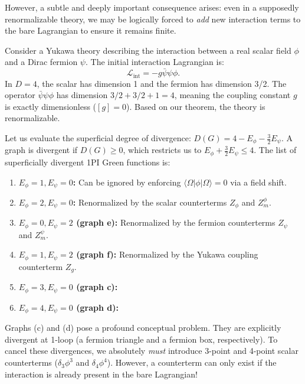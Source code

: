 However, a subtle and deeply important consequence arises: even in a supposedly renormalizable theory, we may be logically forced to \textit{add} new interaction terms to the bare Lagrangian to ensure it remains finite.

\begin{example}
    Consider a Yukawa theory describing the interaction between a real scalar field $\phi$ and a Dirac fermion $\psi$. The initial interaction Lagrangian is:
    \[
        \mathcal{L}_{\text{int}} = -g \bar{\psi} \psi \phi.
    \]
    In $D=4$, the scalar has dimension 1 and the fermion has dimension 3/2. The operator $\bar{\psi}\psi\phi$ has dimension $3/2 + 3/2 + 1 = 4$, meaning the coupling constant $g$ is exactly dimensionless ($[g]=0$). Based on our theorem, the theory is renormalizable.

    Let us evaluate the superficial degree of divergence: $D(G) = 4 - E_\phi - \frac{3}{2}E_\psi$. A graph is divergent if $D(G) \geq 0$, which restricts us to $E_\phi + \frac{3}{2}E_\psi \leq 4$. The list of superficially divergent 1PI Green functions is:


    \begin{enumerate}[label=(\alph*)]
        \item \textbf{$E_\phi=1, E_\psi=0$:} Can be ignored by enforcing $\langle \Omega | \phi | \Omega \rangle = 0$ via a field shift.
        \item \textbf{$E_\phi=2, E_\psi=0$:} Renormalized by the scalar counterterms $Z_\phi$ and $Z_m^\phi$.
        \item \textbf{$E_\phi=0, E_\psi=2$ (graph e):} Renormalized by the fermion counterterms $Z_\psi$ and $Z_m^\psi$.
        \item \textbf{$E_\phi=1, E_\psi=2$ (graph f):} Renormalized by the Yukawa coupling counterterm $Z_g$.
        \item \textbf{$E_\phi=3, E_\psi=0$ (graph c):} 
        \item \textbf{$E_\phi=4, E_\psi=0$ (graph d):} 
    \end{enumerate}

    Graphs (c) and (d) pose a profound conceptual problem. They are explicitly divergent at 1-loop (a fermion triangle and a fermion box, respectively). To cancel these divergences, we absolutely \textit{must} introduce 3-point and 4-point scalar counterterms ($\delta_3 \phi^3$ and $\delta_4 \phi^4$). However, a counterterm can only exist if the interaction is already present in the bare Lagrangian!


\end{example}
